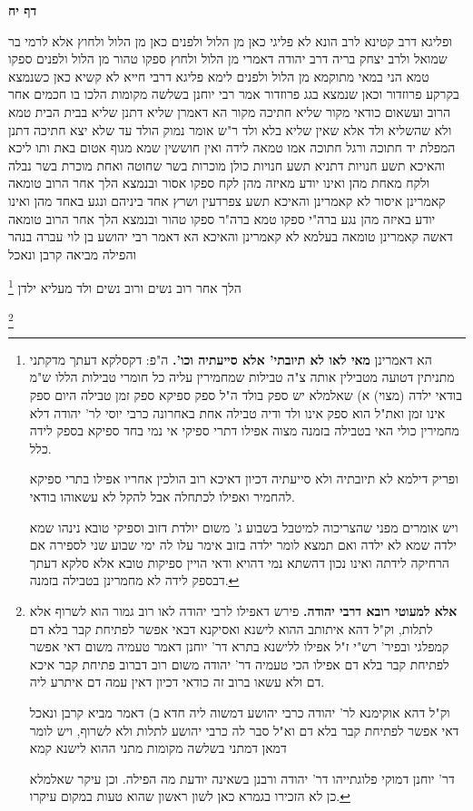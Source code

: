 \documentclass[12pt, openany]{book}
\newcommand{\sethebfont}{
\fontsize{10.5pt}{21.0pt} \selectfont
}
\newcommand{\twocol}[1]{
	{\sethebfont \begin{multicols}{2}
			#1
	\end{multicols}}	
}
\newcommand{\sectname}{}
\newcommand{\newsection}[1]{
	\addcontentsline{toc}{section}{#1}
	\renewcommand{\sectname}{#1}	
	\vspace{-\baselineskip}
	\begin{center}
		\textbf{%
\fontsize{16pt}{16pt}\selectfont
			#1}
	\end{center}
	\vspace{-\baselineskip}
	\nopagebreak
}
\newcommand{\footnotecomment}[1]{
	\renewcommand\thefootnote{}
	\footnote{#1}}
\newcommand{\commenta}[1]{\footnotecomment{#1}}
\begin{document}
\newsection{דף יח}
\twocol{ופליגא דרב קטינא 
לרב הונא לא פליגי כאן מן הלול ולפנים כאן מן הלול ולחוץ 
אלא לרמי בר שמואל ולרב יצחק בריה דרב יהודה דאמרי מן הלול ולחוץ ספקו טהור מן הלול ולפנים ספקו טמא הני במאי מתוקמא מן הלול ולפנים
לימא פליגא דרבי חייא 
לא קשיא כאן כשנמצא בקרקע פרוזדור וכאן שנמצא בגג פרוזדור 
אמר רבי יוחנן בשלשה מקומות הלכו בו חכמים אחר הרוב ועשאום כודאי מקור שליא חתיכה מקור הא דאמרן
שליא דתנן שליא בבית הבית טמא ולא שהשליא ולד אלא שאין שליא בלא ולד ר"ש אומר נמוק הולד עד שלא יצא 
חתיכה דתנן המפלת יד חתוכה ורגל חתוכה אמו טמאה לידה ואין חוששין שמא מגוף אטום באת 
ותו ליכא והאיכא תשע חנויות 
דתניא תשע חנויות כולן מוכרות בשר שחוטה ואחת מוכרת בשר נבלה ולקח מאחת מהן ואינו יודע מאיזה מהן לקח ספקו אסור
ובנמצא הלך אחר הרוב 
טומאה קאמרינן איסור לא קאמרינן 
והאיכא תשע צפרדעין ושרץ אחד ביניהם ונגע באחד מהן ואינו יודע באיזה מהן נגע ברה"י ספקו טמא ברה"ר ספקו טהור
ובנמצא הלך אחר הרוב 
טומאה דאשה קאמרינן טומאה בעלמא לא קאמרינן 
והאיכא הא דאמר רבי יהושע בן לוי עברה בנהר
והפילה מביאה קרבן ונאכל
\commenta{הא דאמרינן \textbf{מאי לאו לא תיובתי' אלא סייעתיה וכו'.} ה"פ: דקסלקא דעתך מדקתני מתניתין דטועה מטבילין אותה צ"ה טבילות שמחמירין עליה כל חומרי טבילות הללו ש"מ בודאי ילדה (מצוי) א) שאלמלא יש ספק בולד ה"ל ספק ספיקא ספק זמן טבילה היום ספק אינו זמן ואת"ל הוא ספק אינו ולד ודיה טבילה אחת באחרונה כרבי יוסי לר' יהודה דלא מחמירין כולי האי בטבילה בזמנה מצוה אפילו דתרי ספיקי אי נמי בחד ספיקא בספק לידה כלל.\par ופריק דילמא לא תיובתיה ולא סייעתיה דכיון דאיכא רוב הולכין אחריו אפילו בתרי ספיקא להחמיר ואפילו לכתחלה אבל להקל לא עשאוהו בודאי.\par ויש אומרים מפני שהצריכוה למיטבל בשבוע ג' משום יולדת דזוב וספיקי טובא נינהו שמא ילדה שמא לא ילדה ואם תמצא לומר ילדה בזוב אימר עלו לה ימי שבוע שני לספירה אם הרחיקה לידתה ואינו נכון דהשתא נמי דהויא ודאי הויין ספיקות טובא אלא סלקא דעתך דבספק לידה לא מחמרינן בטבילה בזמנה. }
הלך אחר רוב נשים ורוב נשים ולד מעליא ילדן 
\commenta{\textbf{אלא למעוטי רובא דרבי יהודה.} פירש דאפילו לרבי יהודה לאו רוב גמור הוא לשרוף אלא לתלות, וק"ל דהא איתותב ההוא לישנא ואסיקנא דבאי אפשר לפתיחת קבר בלא דם קמפלגי ובפיר' רש"י ז"ל אפילו ללישנא בתרא דר' יוחנן דאמר טעמיה משום דאי אפשר לפתיחת קבר בלא דם אפילו הכי טעמיה דר' יהודה משום רוב דברוב פתיחת קבר איכא דם ולא עשאו ברוב זה כודאי דכיון דאין עמה דם איתרע ליה.\par וק"ל דהא אוקימנא לר' יהודה כרבי יהושע דמשוה ליה חדא ב) דאמר מביא קרבן ונאכל דאי אפשר לפתיחת קבר בלא דם וא"ל סבר לה כרבי יהושע לתלות ולא לשרוף, ויש לומר דמאן דמתני בשלשה מקומות מתני ההוא לישנא קמא\par דר' יוחנן דמוקי פלוגתייהו דר' יהודה ורבנן בשאינה יודעת מה הפילה. וכן עיקר שאלמלא כן לא הזכירו בגמרא כאן לשון ראשון שהוא טעות במקום עיקרו. }
}
\end{document}
